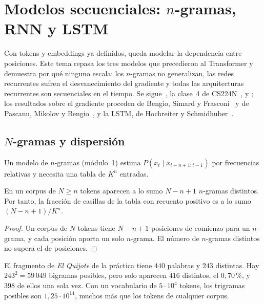 \chapter{Modelos secuenciales: \texorpdfstring{$n$}{n}-gramas, RNN y LSTM}
\label{tema:5}

Con tokens y embeddings ya definidos, queda modelar la dependencia entre posiciones. Este tema repasa los tres modelos que precedieron al Transformer y demuestra por qué ninguno escala: los $n$-gramas no generalizan, las redes recurrentes sufren el desvanecimiento del gradiente y todas las arquitecturas recurrentes son secuenciales en el tiempo. Se sigue~\cite[cap.~14]{jm3}, la clase~4 de CS224N~\cite{cs224n}, \cite[cap.~10]{gbc} y \cite[§9.7 y §10.1]{d2l}; los resultados sobre el gradiente proceden de Bengio, Simard y Frasconi~\cite{bengio94} y de Pascanu, Mikolov y Bengio~\cite[§2--3]{pascanu}, y la LSTM, de Hochreiter y Schmidhuber~\cite{lstm}.

\section{\texorpdfstring{$N$}{N}-gramas y dispersión}

Un modelo de $n$-gramas (módulo~1) estima $P(x_t\mid x_{t-n+1:t-1})$ por frecuencias relativas y necesita una tabla de $K^{n}$ entradas.

\begin{proposicion}\label{prop:dispersion}
En un corpus de $N\ge n$ tokens aparecen a lo sumo $N-n+1$ $n$-gramas distintos. Por tanto, la fracción de casillas de la tabla con recuento positivo es a lo sumo $(N-n+1)/K^{n}$.
\end{proposicion}

\begin{proof}
Un corpus de $N$ tokens tiene $N-n+1$ posiciones de comienzo para un $n$-grama, y cada posición aporta un solo $n$-grama. El número de $n$-gramas distintos no supera el de posiciones.
\end{proof}

\begin{ejemplo}
El fragmento de \emph{El Quijote} de la práctica tiene $440$ palabras y $243$ distintas. Hay $243^{2}=59\,049$ bigramas posibles, pero solo aparecen $416$ distintos, el $0{,}70\,\%$, y $398$ de ellos una sola vez. Con un vocabulario de $5\cdot 10^{4}$ tokens, los trigramas posibles son $1{,}25\cdot 10^{14}$, muchos más que los tokens de cualquier corpus.
\end{ejemplo}

